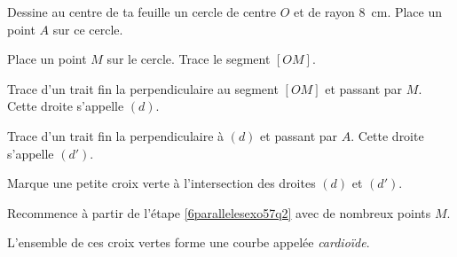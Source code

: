 \begin{myenumerate}
  \item Dessine au centre de ta feuille un cercle de centre $O$ et de rayon 8~cm. Place un point $A$ sur ce cercle.
  \item \label{6parallelesexo57q2} Place un point $M$ sur le cercle. Trace le segment $[OM]$.
  \item Trace d'un trait fin la perpendiculaire au segment $[OM]$ et
    passant par $M$. Cette droite s'appelle $(d)$.
  \item Trace d'un trait fin la perpendiculaire à $(d)$ et passant par $A$. Cette droite s'appelle $(d')$.
  \item Marque une petite croix verte à l'intersection des droites $(d)$ et $(d')$.
  \item Recommence à partir de l'étape \ref{6parallelesexo57q2} avec de nombreux points $M$.
\end{myenumerate}
L'ensemble de ces croix vertes forme une courbe appelée {\em cardioïde}.
